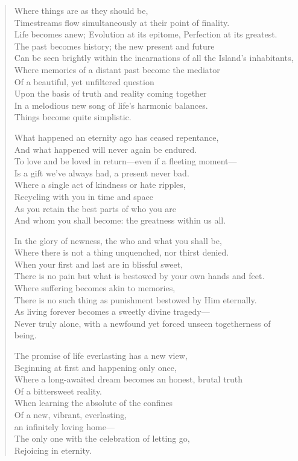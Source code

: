 \documentclass[12pt]{amsart}
\begin{document}
\begin{verse}
Where things are as they should be,\\
Timestreams flow simultaneously at their point of finality.\\
Life becomes anew; Evolution at its epitome, Perfection at its greatest.\\
The past becomes history; the new present and future\\
Can be seen brightly within the incarnations of all the Island's inhabitants,\\
Where memories of a distant past become the mediator\\
Of a beautiful, yet unfiltered question\\
Upon the basis of truth and reality coming together\\
In a melodious new song of life's harmonic balances.\\
Things become quite simplistic.

What happened an eternity ago has ceased repentance,\\
And what happened will never again be endured.\\
To love and be loved in return---even if a fleeting moment---\\
Is a gift we’ve always had, a present never bad.\\
Where a single act of kindness or hate ripples,\\
Recycling with you in time and space\\
As you retain the best parts of who you are\\
And whom you shall become: the greatness within us all.

In the glory of newness, the who and what you shall be,\\
Where there is not a thing unquenched, nor thirst denied.\\
When your first and last are in blissful sweet,\\
There is no pain but what is bestowed by your own hands and feet.\\
Where suffering becomes akin to memories,\\
There is no such thing as punishment bestowed by Him eternally.\\
As living forever becomes a sweetly divine tragedy---\\
Never truly alone, with a newfound yet forced unseen togetherness of being.

The promise of life everlasting has a new view,\\
Beginning at first and happening only once,\\
Where a long-awaited dream becomes an honest, brutal truth\\
Of a bittersweet reality.\\
When learning the absolute of the confines\\
Of a new, vibrant, everlasting,\\
an infinitely loving home---\\
The only one with the celebration of letting go,\\
Rejoicing in eternity.


\end{verse}
\end{document}
